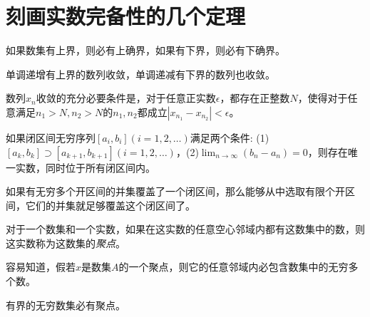 
\section{刻画实数完备性的几个定理}
\label{sec:some-theorems-for-real-completeness}


\begin{theorem}[确界定理]
  如果数集有上界，则必有上确界，如果有下界，则必有下确界。
\end{theorem}

\begin{theorem}[单调有界定理]
  单调递增有上界的数列收敛，单调递减有下界的数列也收敛。
\end{theorem}

\begin{theorem}[柯西收敛准则]
  数列$x_n$收敛的充分必要条件是，对于任意正实数$\epsilon$，都存在正整数$N$，使得对于任意满足$n_1>N,n_2>N$的$n_1,n_2$都成立$|x_{n_1}-x_{n_2}| < \epsilon$。
\end{theorem}

\begin{theorem}[闭区间套定理]
  如果闭区间无穷序列$[a_i,b_i](i=1,2,\ldots)$满足两个条件: (1)$[a_k,b_k]\supset[a_{k+1},b_{k+1}](i=1,2,\ldots)$，(2)$\lim_{n\to\infty}(b_n-a_n)=0$，则存在唯一实数，同时位于所有闭区间内。
\end{theorem}

\begin{theorem}[有限覆盖定理]
  如果有无穷多个开区间的并集覆盖了一个闭区间，那么能够从中选取有限个开区间，它们的并集就足够覆盖这个闭区间了。
\end{theorem}

\begin{definition}
  对于一个数集和一个实数，如果在这实数的任意空心邻域内都有这数集中的数，则这实数称为这数集的\emph{聚点}。
\end{definition}

容易知道，假若$x$是数集$A$的一个聚点，则它的任意邻域内必包含数集中的无穷多个数。

\begin{theorem}[聚点定理]
  有界的无穷数集必有聚点。
\end{theorem}



